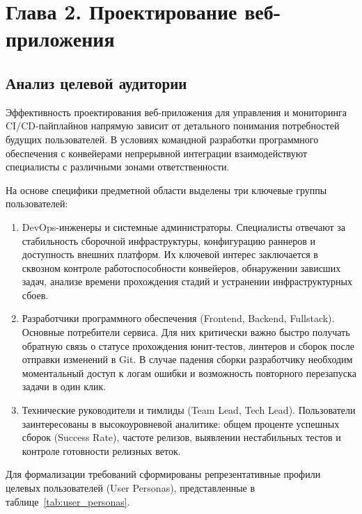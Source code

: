 \section*{Глава 2. Проектирование веб-приложения}

\subsection{Анализ целевой аудитории}

Эффективность проектирования веб-приложения для управления и мониторинга CI/CD-пайплайнов напрямую зависит от детального понимания потребностей будущих пользователей. В условиях командной разработки программного обеспечения с конвейерами непрерывной интеграции взаимодействуют специалисты с различными зонами ответственности.

На основе специфики предметной области выделены три ключевые группы пользователей:
\begin{enumerate}
    \item DevOps-инженеры и системные администраторы. Специалисты отвечают за стабильность сборочной инфраструктуры, конфигурацию раннеров и доступность внешних платформ. Их ключевой интерес заключается в сквозном контроле работоспособности конвейеров, обнаружении зависших задач, анализе времени прохождения стадий и устранении инфраструктурных сбоев.
    \item Разработчики программного обеспечения (Frontend, Backend, Fullstack). Основные потребители сервиса. Для них критически важно быстро получать обратную связь о статусе прохождения юнит-тестов, линтеров и сборок после отправки изменений в Git. В случае падения сборки разработчику необходим моментальный доступ к логам ошибки и возможность повторного перезапуска задачи в один клик.
    \item Технические руководители и тимлиды (Team Lead, Tech Lead). Пользователи заинтересованы в высокоуровневой аналитике: общем проценте успешных сборок (Success Rate), частоте релизов, выявлении нестабильных тестов и контроле готовности релизных веток.
\end{enumerate}

Для формализации требований сформированы репрезентативные профили целевых пользователей (User Personas), представленные в таблице~\ref{tab:user_personas}.

